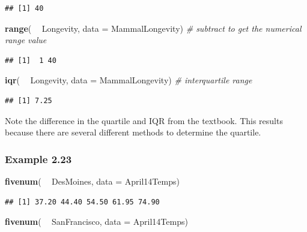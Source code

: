 \documentclass[]{book}
\newenvironment{Shaded}{\begin{snugshade}}{\end{snugshade}}
\newcommand{\CommentTok}[1]{\textcolor[rgb]{0.56,0.35,0.01}{\textit{#1}}}
\newcommand{\DataTypeTok}[1]{\textcolor[rgb]{0.13,0.29,0.53}{#1}}
\newcommand{\KeywordTok}[1]{\textcolor[rgb]{0.13,0.29,0.53}{\textbf{#1}}}
\newcommand{\NormalTok}[1]{#1}
\newcommand{\OperatorTok}[1]{\textcolor[rgb]{0.81,0.36,0.00}{\textbf{#1}}}
\newcommand{\StringTok}[1]{\textcolor[rgb]{0.31,0.60,0.02}{#1}}
\begin{document}
\begin{verbatim}
## [1] 40
\end{verbatim}

\begin{Shaded}
\begin{Highlighting}[]
\KeywordTok{range}\NormalTok{( }\OperatorTok{~}\StringTok{ }\NormalTok{Longevity, }\DataTypeTok{data =}\NormalTok{ MammalLongevity)  }\CommentTok{# subtract to get the numerical range value}
\end{Highlighting}
\end{Shaded}

\begin{verbatim}
## [1]  1 40
\end{verbatim}

\begin{Shaded}
\begin{Highlighting}[]
\KeywordTok{iqr}\NormalTok{( }\OperatorTok{~}\StringTok{ }\NormalTok{Longevity, }\DataTypeTok{data =}\NormalTok{ MammalLongevity)   }\CommentTok{# interquartile range }
\end{Highlighting}
\end{Shaded}

\begin{verbatim}
## [1] 7.25
\end{verbatim}

Note the difference in the quartile and IQR from the textbook. This results because there are several different methods to determine the quartile.

\hypertarget{example-2.23}{%
\subsubsection{Example 2.23}\label{example-2.23}}

\begin{Shaded}
\begin{Highlighting}[]
\KeywordTok{fivenum}\NormalTok{( }\OperatorTok{~}\StringTok{ }\NormalTok{DesMoines, }\DataTypeTok{data =}\NormalTok{ April14Temps)}
\end{Highlighting}
\end{Shaded}

\begin{verbatim}
## [1] 37.20 44.40 54.50 61.95 74.90
\end{verbatim}

\begin{Shaded}
\begin{Highlighting}[]
\KeywordTok{fivenum}\NormalTok{( }\OperatorTok{~}\StringTok{ }\NormalTok{SanFrancisco, }\DataTypeTok{data =}\NormalTok{ April14Temps)}
\end{Highlighting}
\end{Shaded}
\end{document}
